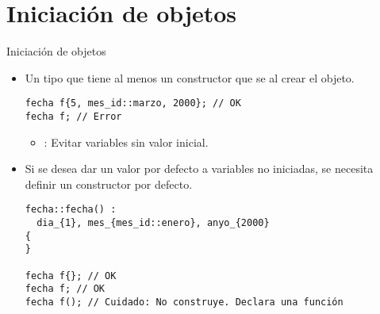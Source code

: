 \section{Iniciación de objetos}

\begin{frame}[t,fragile]{Iniciación de objetos}
\begin{itemize}
  \item Un tipo que tiene al menos un constructor  
        que se  al crear el objeto.
\begin{lstlisting}
fecha f{5, mes_id::marzo, 2000}; // OK
fecha f; // Error
\end{lstlisting}
    \begin{itemize}
      \item {}: Evitar variables sin valor inicial.
    \end{itemize}

  \item Si se desea dar un valor por defecto a variables no iniciadas, se
        necesita definir un constructor por defecto.
\begin{lstlisting}
fecha::fecha() :
  dia_{1}, mes_{mes_id::enero}, anyo_{2000}
{
}

fecha f{}; // OK
fecha f; // OK
fecha f(); // Cuidado: No construye. Declara una función
\end{lstlisting}
\end{itemize}
\end{frame}

